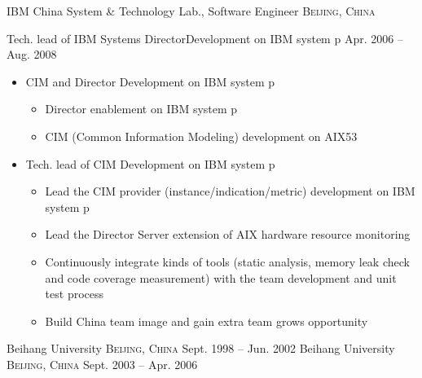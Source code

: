 \documentclass[10pt,letterpaper]{article}
\begin{document}
\headedsection 
{IBM China System \& Technology Lab., Software Engineer}
{\textsc{Beijing, China}} {

\headedsubsection %
{Tech. lead of IBM Systems Director\texttrademark Development on IBM system p}
{Apr. 2006 -- Aug. 2008}
{
    \begin{itemize}
        \item CIM and Director Development on IBM system p
    \begin{itemize}
\item Director enablement on IBM system p
\item CIM (Common Information Modeling) development on AIX53
    \end{itemize}
\item Tech. lead of CIM Development on IBM system p
    \begin{itemize}
        \item Lead the CIM provider (instance/indication/metric) development on
    IBM system p
\item Lead the Director Server extension of AIX hardware resource
    monitoring
\item Continuously integrate kinds of tools (static analysis, memory leak
    check and code coverage measurement) with the team development and unit
    test process
\item Build China team image and gain extra team grows opportunity
    \end{itemize}
    \end{itemize}


}
}

\spacedhrule{-0.2em}{-0.4em} %



\headedsection %
{Beihang University}
{\textsc{Beijing, China}} {
 {Sept. 1998 -- Jun. 2002} {}
}
\headedsection
{Beihang University}
{\textsc{Beijing, China}} {
    {Sept. 2003 -- Apr. 2006} {}
}
\end{document}
